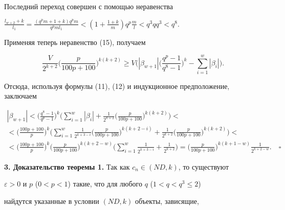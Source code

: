 Последний переход совершен с помощью неравенства


$\frac{l_{w+2}+k}{l_1}=\frac{(q^p m+1+k) q^p m}{q^p m l_1} 


<(1+\frac{1+k}{m}) q^p \frac{m}{l}<q^3 q q^3<q^8$.


Применяя теперь неравенство (15), получаем


$$


\frac{V}{2^{k+2}} \bigg(\frac{p}{100p+100}\bigg)^{k(k+2)} \ge 


V \bigg(| \beta_{w+1} |


\bigg(\frac{q^p -1}{q^8-1}\bigg)^k-\sum_{i=1}^{w} | \beta_i |\bigg).


$$


Отсюда, используя формулы (11), (12) и индукционное предположение, заключаем


\begin{multline*}


| \beta_{w+1} |<\bigg(\frac{q^8 -1}{q^p-1}\bigg)^k 


\bigg(\sum_{i=1}^{w} | \beta_i |+\frac{1}{2^{k+2}}


\bigg(\frac{p}{100p+100}\bigg)^{k(k+2)}\bigg)< \\


%


< \bigg(\frac{100p+100}{p}\bigg)^k \bigg(\sum_{i=1}^{w} \frac{1}{2^{k+3-i}} 


\bigg(\frac{p}{100p+100}\bigg)^{k(k+2 -i)}+\frac{1}{2^{k+2}}


\bigg(\frac{p}{100p+100}\bigg)^{k(k+2)}\bigg)< \\


%


< \bigg(\frac{100p+100}{p}\bigg)^k \bigg(\frac{p}{100p+100}\bigg)^{k(k+2-w)} 


\bigg(\sum_{i=1}^{w} \frac{1}{2^{k+3-i}}+\frac{1}{2^{k+2}}\bigg)=


%


\bigg(\frac{p}{100p+100}\bigg)^{k(k+1-w)} \frac{1}{2^{k+2-w}}.\quad\square


\end{multline*}








{\bf 3. Доказательство теоремы 1.} Так как $c_n\in(ND,k)$, то существуют 


$\varepsilon>0$ и $p$ ($0<p<1$) такие, что для любого $q$ ($1<q<q^3 \le 2$) 


найдутся указанные в условии $(ND, k)$ объекты, зависящие, 


